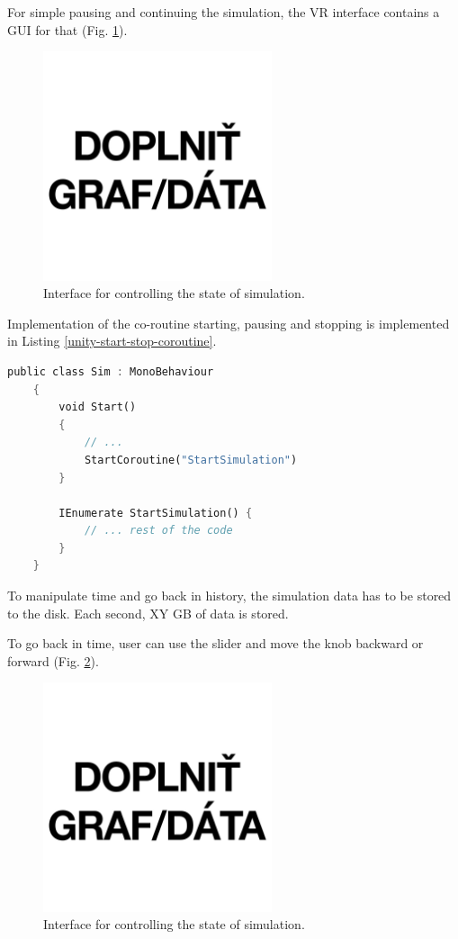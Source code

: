 For simple pausing and continuing the simulation, the VR interface contains a GUI for that (Fig. \ref{fig:unity-pause-play}).

\begin{figure}[!ht]
	\centering
	\includegraphics[width=0.6\textwidth]{figures/empty.jpg}
	\caption{Interface for controlling the state of simulation.}
	\label{fig:unity-pause-play}
\end{figure}

Implementation of the co-routine starting, pausing and stopping is implemented in Listing \ref{unity-start-stop-coroutine}.

\begin{lstlisting}[language=Rust, caption="Starting\, pausing and stopping the co-routines in Unity.", label=unity-start-stop-coroutine]
	public class Sim : MonoBehaviour
	{
		void Start()
		{
			// ...
			StartCoroutine("StartSimulation")
		}
		
		IEnumerate StartSimulation() {
			// ... rest of the code
		}
	}
\end{lstlisting}

To manipulate time and go back in history, the simulation data has to be stored to the disk. Each second, XY GB of data is stored. 

To go back in time, user can use the slider and move the knob backward or forward (Fig. \ref{fig:unity-time-manipulation}).

\begin{figure}[!ht]
	\centering
	\includegraphics[width=0.6\textwidth]{figures/empty.jpg}
	\caption{Interface for controlling the state of simulation.}
	\label{fig:unity-time-manipulation}
\end{figure}

